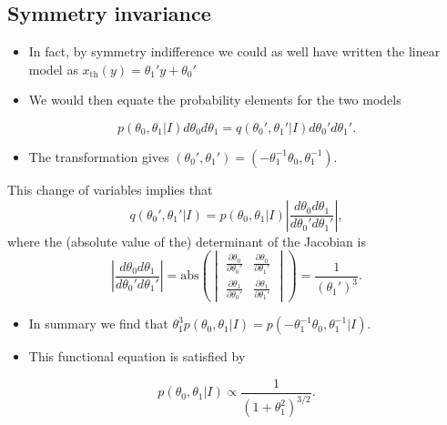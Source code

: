 \documentclass[%
oneside,                 %
final,                   %
10pt]{article}
\begin{document}
\noindent
\subsection{Symmetry invariance}

\begin{itemize}
\item In fact, by symmetry indifference we could as well have written the linear model as $x_\mathrm{th}(y) = \theta_1'  y  + \theta_0'$

\item We would then equate the probability elements for the two models 
\end{itemize}

\noindent
\[
p(\theta_0, \theta_1 | I) d\theta_0 d\theta_1 = q(\theta_0', \theta_1' | I) d\theta_0' d\theta_1'.
\]

\begin{itemize}
\item The transformation gives $(\theta_0', \theta_1') = (-\theta_1^{-1}\theta_0, \theta_1^{-1})$.
\end{itemize}

\noindent
This change of variables implies that
\[
q(\theta_0', \theta_1' | I) = p(\theta_0, \theta_1 | I) \left| \frac{d\theta_0 d\theta_1}{d\theta_0' d\theta_1'} \right|,
\]
where the (absolute value of the) determinant of the Jacobian is
\[
\left| \frac{d\theta_0 d\theta_1}{d\theta_0' d\theta_1'} \right| 
= \mathrm{abs} \left( 
\begin{vmatrix}
\frac{\partial \theta_0}{\partial \theta_0'} & \frac{\partial \theta_0}{\partial \theta_1'} \\
\frac{\partial \theta_1}{\partial \theta_0'} & \frac{\partial \theta_1}{\partial \theta_1'} 
\end{vmatrix}
\right)
= \frac{1}{\left( \theta_1' \right)^3}.
\]

\begin{itemize}
\item In summary we find that $\theta_1^3 p(\theta_0, \theta_1 | I) = p(-\theta_1^{-1}\theta_0, \theta_1^{-1}|I).$

\item This functional equation is satisfied by
\end{itemize}

\noindent
\[
p(\theta_0, \theta_1 | I) \propto \frac{1}{\left( 1 + \theta_1^2 \right)^{3/2}}.
\]

\end{document}
